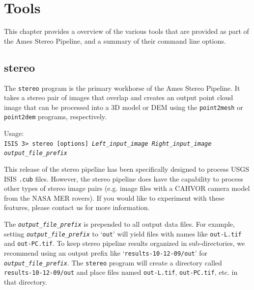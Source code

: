 \chapter{Tools}

This chapter provides a overview of the various tools that are
provided as part of the Ames Stereo Pipeline, and a summary of their
command line options.


\section{stereo}
\label{stereo}

The \texttt{stereo} program is the primary workhorse of the Ames
Stereo Pipeline.  It takes a stereo pair of images that overlap and
creates an output point cloud image that can be processed into a 3D
model or DEM using the \texttt{point2mesh} or \texttt{point2dem}
programs, respectively.  

\medskip

Usage:\\
\hspace*{2em}\texttt{ISIS 3> stereo [options] \textit{Left\_input\_image Right\_input\_image output\_file\_prefix}}

\medskip

This release of the stereo pipeline has been specifically designed to
process USGS ISIS \texttt{.cub} files.  However, the stereo pipeline
does have the capability to process other types of stereo image pairs
(e.g. image files with a CAHVOR camera model from the NASA MER
rovers).  If you would like to experiment with these features, please
contact us for more information.

The \texttt{\textit{output\_file\_prefix}} is prepended to all
output data files.  For example, setting \texttt{\textit{output\_file\_prefix}}
to `\texttt{out}' will yield files with names like \texttt{out-L.tif}
and \texttt{out-PC.tif}.  To keep stereo pipeline results organized
in sub-directories, we recommend using an output prefix like
`\texttt{results-10-12-09/out}' for \texttt{\textit{output\_file\_prefix}}.  The
\texttt{stereo} program will create a directory called
\texttt{results-10-12-09/out} and place files named \texttt{out-L.tif},
\texttt{out-PC.tif}, etc. in that directory.

